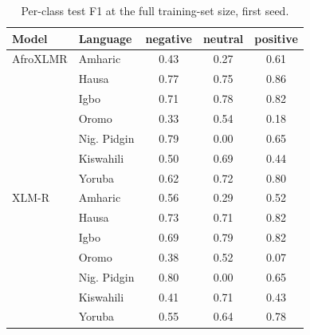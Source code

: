 \begin{table}[t]
\centering
\caption{Per-class test F1 at the full training-set size, first seed.}
\label{tab:per_class_f1}
\small
\begin{tabular}{llccc}
\toprule
Model & Language & negative & neutral & positive \\
\midrule
AfroXLMR & Amharic & 0.43 & 0.27 & 0.61 \\
 & Hausa & 0.77 & 0.75 & 0.86 \\
 & Igbo & 0.71 & 0.78 & 0.82 \\
 & Oromo & 0.33 & 0.54 & 0.18 \\
 & Nig. Pidgin & 0.79 & 0.00 & 0.65 \\
 & Kiswahili & 0.50 & 0.69 & 0.44 \\
 & Yoruba & 0.62 & 0.72 & 0.80 \\
\midrule
XLM-R & Amharic & 0.56 & 0.29 & 0.52 \\
 & Hausa & 0.73 & 0.71 & 0.82 \\
 & Igbo & 0.69 & 0.79 & 0.82 \\
 & Oromo & 0.38 & 0.52 & 0.07 \\
 & Nig. Pidgin & 0.80 & 0.00 & 0.65 \\
 & Kiswahili & 0.41 & 0.71 & 0.43 \\
 & Yoruba & 0.55 & 0.64 & 0.78 \\
\bottomrule
\end{tabular}
\end{table}